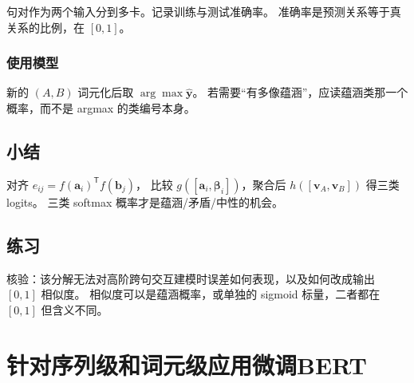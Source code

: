 句对作为两个输入分到多卡。记录训练与测试准确率。
准确率是预测关系等于真关系的比例，在 $[0,1]$。

\subsubsection{使用模型}

新的 $(A,B)$ 词元化后取 $\arg\max\hat{\bm{y}}$。
若需要“有多像蕴涵”，应读蕴涵类那一个概率，而不是 argmax 的类编号本身。

\subsection{小结}

对齐 $e_{ij}=f(\bm{a}_i)^{\mathsf T}f(\bm{b}_j)$，
比较 $g([\bm{a}_i,\bm{\beta}_i])$，聚合后 $h([\bm{v}_A,\bm{v}_B])$ 得三类 logits。
三类 softmax 概率才是蕴涵/矛盾/中性的机会。

\subsection{练习}

核验：该分解无法对高阶跨句交互建模时误差如何表现，以及如何改成输出 $[0,1]$ 相似度。
相似度可以是蕴涵概率，或单独的 sigmoid 标量，二者都在 $[0,1]$ 但含义不同。

\section{针对序列级和词元级应用微调BERT}






